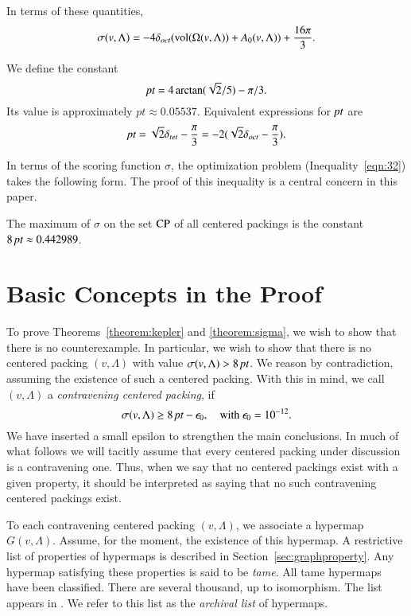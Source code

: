 In terms of these quantities,
\begin{equation}
    \sigma(v,\Lambda) = -4 \delta_{oct} ({\operatorname{vol}}(\Omega(v,\Lambda)) + A_0(v,\Lambda)) +
    \frac{16\pi}{3}.
\end{equation}

\begin{definition}\label{def:pt}
We define the constant
   $$\hbox{\it pt} = 4\arctan(\sqrt2/5) - \pi/3.$$
Its value is approximately $pt \approx 0.05537.$  Equivalent
expressions for $\hbox{\it pt}$ are
    $$
    \hbox{\it pt} = \sqrt2 \delta_{tet} - \frac{\pi}{3} = -2 (\sqrt2 \delta_{oct} -
    \frac{\pi}{3}).
    $$
\end{definition}

In terms of the scoring function $\sigma$, the optimization
problem (Inequality~\ref{eqn:32}) takes the following form. The
proof of this inequality is a central concern in this paper.

\begin{theorem}\label{theorem:sigma}
The maximum of $\sigma$ on the set ${\operatorname{CP}}$ of all centered
packings is the constant $8\,\hbox{\it pt}\approx 0.442989$.
\end{theorem}



\section{Basic Concepts in the Proof}
\label{sec:outline}

To prove Theorems~\ref{theorem:kepler} and \ref{theorem:sigma}, we
wish to show that there is no counterexample.  In particular, we
wish to show that there is no centered packing $(v,\Lambda)$ with value
$\sigma(v,\Lambda)
> 8\,\hbox{\it pt}$.  We reason by contradiction, assuming the existence of
such a centered packing.  With this in mind, we call $(v,\Lambda)$ a {\it
contravening centered packing}, if
    $$\sigma(v,\Lambda)\ge 8\,\hbox{\it pt} - \epsilon_0, \quad \text{with }\epsilon_0 = 10^{-12}.$$
We have inserted a small epsilon to strengthen the main
conclusions.  In much of what follows we will tacitly assume that
every centered packing under discussion is a contravening one.
Thus, when we say that no centered packings exist with a given
property, it should be interpreted as saying that no such
contravening centered packings exist.

To each contravening centered packing $(v,\Lambda)$, we associate a hypermap
$G(v,\Lambda)$.   Assume, for the moment, the existence of this hypermap.
A restrictive list of properties of hypermaps is described in
Section~\ref{sec:graphproperty}. Any hypermap satisfying these
properties is said to be {\it tame}. All  tame
hypermaps have been classified. There are several thousand, up to
isomorphism.  The list appears in \cite{web}.  We refer to this
list as the {\it archival list}
of hypermaps.

